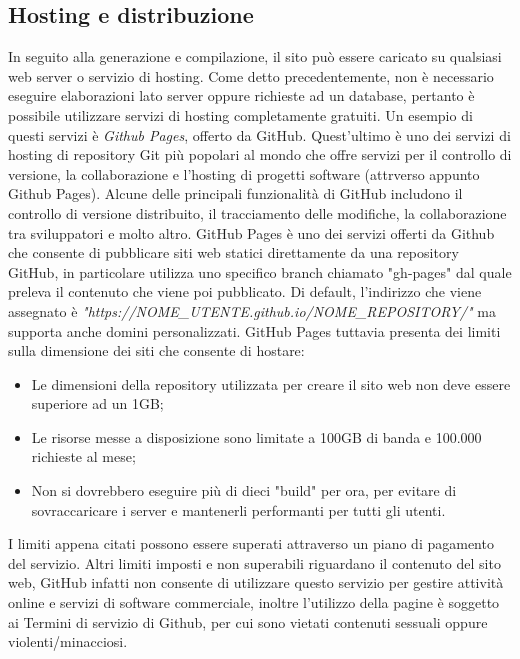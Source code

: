 \documentclass[target=bach,aauheader=]{thud}
\begin{document}
\subsection{Hosting e distribuzione}\label{subsec:hosting}
In seguito alla generazione e compilazione, il sito può essere caricato su qualsiasi web server o servizio di hosting. Come detto precedentemente, non è necessario eseguire elaborazioni lato server oppure richieste ad un database, pertanto è possibile utilizzare servizi di hosting completamente gratuiti.
\newline
Un esempio di questi servizi è \textit{Github Pages}, offerto da GitHub. Quest'ultimo è uno dei servizi di hosting di repository Git più popolari al mondo che offre servizi per il controllo di versione, la collaborazione e l'hosting di progetti software (attrverso appunto Github Pages).
Alcune delle principali funzionalità di GitHub includono il controllo di versione distribuito, il tracciamento delle modifiche, la collaborazione tra sviluppatori e molto altro.
GitHub Pages è uno dei servizi offerti da Github che consente di pubblicare siti web statici direttamente da una repository GitHub, in particolare utilizza uno specifico branch chiamato "gh-pages" dal quale preleva il contenuto che viene poi pubblicato.
Di default, l'indirizzo che viene assegnato è \textit{"https://NOME\_UTENTE.github.io/NOME\_REPOSITORY/"} ma supporta anche domini personalizzati. 
\newline 
GitHub Pages tuttavia presenta dei limiti sulla dimensione dei siti che consente di hostare:
\begin{itemize}
    \item Le dimensioni della repository utilizzata per creare il sito web non deve essere superiore ad un 1GB;
    \item Le risorse messe a disposizione sono limitate a 100GB di banda e 100.000 richieste al mese;
    \item Non si dovrebbero eseguire più di dieci "build" per ora, per evitare di sovraccaricare i server e mantenerli performanti per tutti gli utenti.
\end{itemize}
I limiti appena citati possono essere superati attraverso un piano di pagamento del servizio.
\newline
Altri limiti imposti e non superabili riguardano il contenuto del sito web, GitHub infatti non consente di utilizzare questo servizio per gestire attività online e servizi di software commerciale, inoltre l'utilizzo della pagine è soggetto ai Termini di servizio di Github,
per cui sono vietati contenuti sessuali oppure violenti/minacciosi. 
\end{document}
